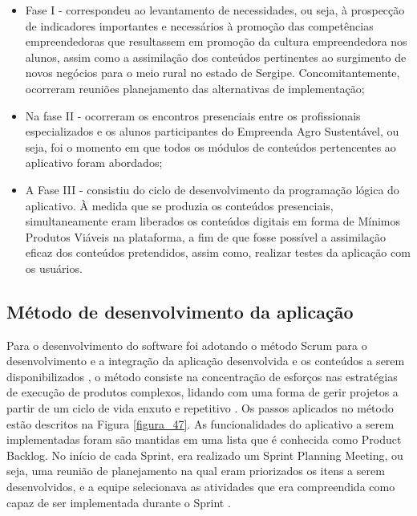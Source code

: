     \begin{itemize}
    \item{Fase I - correspondeu ao levantamento de necessidades, ou seja, à prospecção de indicadores importantes e necessários à promoção das competências empreendedoras que resultassem em promoção da cultura empreendedora nos alunos, assim como a assimilação dos conteúdos pertinentes ao surgimento de novos negócios para o meio rural no estado de Sergipe. Concomitantemente, ocorreram reuniões planejamento das alternativas de implementação;}
    \item{Na fase II - ocorreram os encontros presenciais entre os profissionais especializados e os alunos participantes do Empreenda Agro Sustentável, ou seja, foi o momento em que todos os módulos de conteúdos pertencentes ao aplicativo foram abordados;}
    \item{A Fase III - consistiu do ciclo de desenvolvimento da programação lógica do aplicativo. À medida que se produzia os conteúdos presenciais, simultaneamente eram liberados os conteúdos digitais em forma de Mínimos Produtos Viáveis na plataforma, a fim de que fosse possível a assimilação eficaz dos conteúdos pretendidos, assim como, realizar testes da aplicação com os usuários.}
    
\end{itemize}

\subsection{Método de desenvolvimento da aplicação}

Para o desenvolvimento do software foi adotando o método Scrum para o desenvolvimento e a integração da aplicação desenvolvida e os conteúdos a serem disponibilizados \cite{schreier_solar_2017},  o método consiste na concentração de esforços nas estratégias de execução de produtos complexos, lidando com uma forma de gerir projetos a partir de um ciclo de vida enxuto e repetitivo \cite{bernardo_framework_2019}. Os passos aplicados no método estão descritos na Figura \ref{figura_47}. 
As funcionalidades do aplicativo a serem implementadas foram são mantidas em uma lista que é conhecida como Product Backlog. No início de cada Sprint, era realizado um Sprint Planning Meeting, ou seja, uma reunião de planejamento na qual eram priorizados os itens a serem desenvolvidos, e a equipe selecionava as atividades que era compreendida como capaz de ser implementada durante o Sprint \cite{trainning_education_services_curso_2018}.


